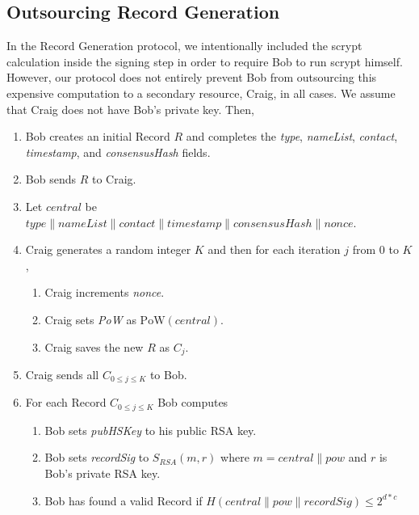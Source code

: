 \documentclass{sig-alternate}
\newcommand*\concat{\mathbin{\|}}
\begin{document}
\subsection{Outsourcing Record Generation}

In the Record Generation protocol, we intentionally included the scrypt calculation inside the signing step in order to require Bob to run scrypt himself. However, our protocol does not entirely prevent Bob from outsourcing this expensive computation to a secondary resource, Craig, in all cases. We assume that Craig does not have Bob's private key. Then,

\begin{enumerate}
	\item Bob creates an initial Record $ R $ and completes the \emph{type}, \emph{nameList}, \emph{contact}, \emph{timestamp}, and \emph{consensusHash} fields.
	\item Bob sends $ R $ to Craig.
	\item Let $ \mathit{central} $ be $\mathit{type} \concat \mathit{nameList} \concat \mathit{contact} \concat \mathit{timestamp} \concat \mathit{consensusHash} \concat \mathit{nonce} $.
	\item Craig generates a random integer $ K $ and then for each iteration $ j $ from 0 to $ K $,
		\begin{enumerate}
			\item Craig increments \emph{nonce}.
			\item Craig sets \emph{PoW} as $ \mathrm{PoW}(\mathit{central}) $.
			\item Craig saves the new $ R $ as $ C_{j} $.
		\end{enumerate}
	\item Craig sends all $ C_{0 \le j \le K} $ to Bob.
	\item For each Record $ C_{0 \le j \le K} $ Bob computes
		\begin{enumerate}
			\item Bob sets \emph{pubHSKey} to his public RSA key.
			\item Bob sets \emph{recordSig} to $ S_{\mathit{RSA}}(m, r) $ where $ m = \mathit{central} \concat \mathit{pow} $ and $ r $ is Bob's private RSA key.
			\item Bob has found a valid Record if $ H(\mathit{central} \concat \mathit{pow} \concat \mathit{recordSig}) \leq 2^{\mathit{d} * \mathit{c}} $
		\end{enumerate}
\end{enumerate}
\end{document}
